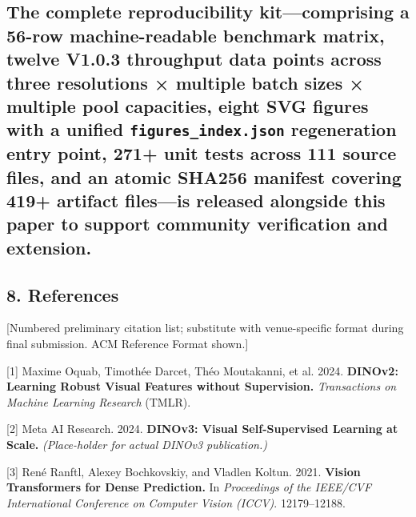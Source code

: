 \documentclass[
]{article}
\begin{document}
\subsection{\texorpdfstring{The complete reproducibility
kit---comprising a 56-row machine-readable benchmark matrix, twelve
V1.0.3 throughput data points across three resolutions × multiple batch
sizes × multiple pool capacities, eight SVG figures with a unified
\texttt{figures\_index.json} regeneration entry point, 271+ unit tests
across 111 source files, and an atomic SHA256 manifest covering 419+
artifact files---is released alongside this paper to support community
verification and
extension.}{The complete reproducibility kit---comprising a 56-row machine-readable benchmark matrix, twelve V1.0.3 throughput data points across three resolutions × multiple batch sizes × multiple pool capacities, eight SVG figures with a unified figures\_index.json regeneration entry point, 271+ unit tests across 111 source files, and an atomic SHA256 manifest covering 419+ artifact files---is released alongside this paper to support community verification and extension.}}\label{the-complete-reproducibility-kitcomprising-a-56-row-machine-readable-benchmark-matrix-twelve-v103-throughput-data-points-across-three-resolutions--multiple-batch-sizes--multiple-pool-capacities-eight-svg-figures-with-a-unified-figures_indexjson-regeneration-entry-point-271-unit-tests-across-111-source-files-and-an-atomic-sha256-manifest-covering-419-artifact-filesis-released-alongside-this-paper-to-support-community-verification-and-extension}

\subsection{8. References}\label{8-references}

{[}Numbered preliminary citation list; substitute with venue-specific
format during final submission. ACM Reference Format shown.{]}

{[}1{]} Maxime Oquab, Timothée Darcet, Théo Moutakanni, et al. 2024.
\textbf{DINOv2: Learning Robust Visual Features without Supervision.}
\emph{Transactions on Machine Learning Research} (TMLR).

{[}2{]} Meta AI Research. 2024. \textbf{DINOv3: Visual Self-Supervised
Learning at Scale.} \emph{(Place-holder for actual DINOv3 publication.)}

{[}3{]} René Ranftl, Alexey Bochkovskiy, and Vladlen Koltun. 2021.
\textbf{Vision Transformers for Dense Prediction.} In \emph{Proceedings
of the IEEE/CVF International Conference on Computer Vision (ICCV)}.
12179--12188.
\end{document}
